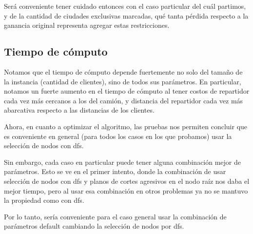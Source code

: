 \documentclass{article}
\begin{document}
    Será conveniente tener cuidado entonces con el caso particular del cuál partimos, y de la cantidad de ciudades exclusivas marcadas, qué tanta pérdida respecto a la ganancia original representa agregar estas restricciones.

    \subsection{Tiempo de cómputo}
    Notamos que el tiempo de cómputo depende fuertemente no solo del tamaño de la instancia (cantidad de clientes), sino de todos sus parámetros. En particular, notamos un fuerte aumento en el tiempo de cómputo al tener costos de repartidor cada vez más cercanos a los del camión, y distancia del repartidor cada vez más abarcativa respecto a las distancias de los clientes.
    
    Ahora, en cuanto a optimizar el algoritmo, las pruebas nos permiten concluir que es conveniente en general (para todos los casos en los que probamos) usar la selección de nodos con dfs. 
    
    Sin embargo, cada caso en particular puede tener alguna combinación mejor de parámetros. Esto se ve en el primer intento, donde la combinación de usar selección de nodos con dfs y planos de cortes agresivos en el nodo raíz nos daba el mejor tiempo, pero al usar esa combinación en otros problemas ya no se mantuvo la propiedad como con dfs. 
    
    Por lo tanto, sería conveniente para el caso general usar la combinación de parámetros default cambiando la selección de nodos por dfs.
    
    
\end{document}
